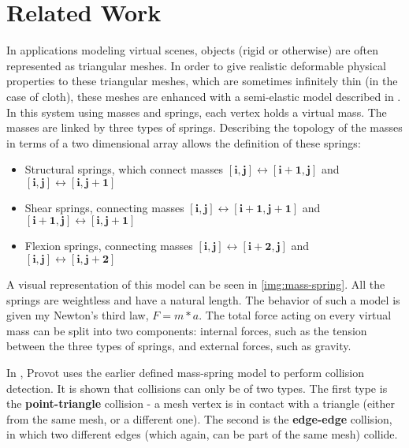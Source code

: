 \section{Related Work}
\label{sec:sota}



In applications modeling virtual scenes, objects (rigid or otherwise) are often represented as triangular meshes. In order to give realistic deformable physical properties to these triangular meshes, which are sometimes infinitely thin (in the case of cloth), these meshes are enhanced with a semi-elastic model described in \citep{provot95}. In this system using masses and springs, each vertex holds a virtual mass. The masses are linked by three types of springs. Describing the topology of the masses in terms of a two dimensional array allows the definition of these springs:

\begin{itemize}
	\item Structural springs, which connect masses $\mathbf{[i, j] \leftrightarrow [i + 1, j]}$ and $\mathbf{[i, j] \leftrightarrow [i,j + 1]}$
	\item Shear springs, connecting masses $\mathbf{[i, j] \leftrightarrow [i + 1, j + 1]}$ and $\mathbf{[i + 1, j] \leftrightarrow [i, j + 1]}$
	\item Flexion springs, connecting masses $\mathbf{[i, j] \leftrightarrow [i + 2, j]}$ and $\mathbf{[i, j] \leftrightarrow [i, j + 2]}$
\end{itemize}

A visual representation of this model can be seen in \autoref{img:mass-spring}. All the springs are weightless and have a natural length. The behavior of such a model is given my Newton's third law, $F = m * a$. The total force acting on every virtual mass can be split into two components: internal forces, such as the tension between the three types of springs, and external forces, such as gravity.

In \citep{provot97}, Provot uses the earlier defined mass-spring model \citep{provot95} to perform collision detection. It is shown that collisions can only be of two types. The first type is the \textbf{point-triangle} collision - a mesh vertex is in contact with a triangle (either from the same mesh, or a different one). The second is the \textbf{edge-edge} collision, in which two different edges (which again, can be part of the same mesh) collide.

